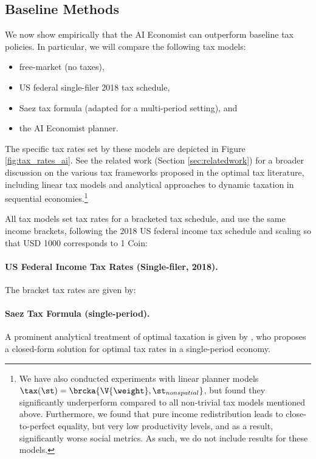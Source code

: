 \subsection{Baseline Methods}
\label{sect:baselines}
We now show empirically that the AI Economist can outperform baseline tax policies.
In particular, we will compare the following tax models:
\begin{itemize}
 \item free-market (no taxes),
 \item US federal single-filer 2018 tax schedule,
 \item Saez tax formula (adapted for a multi-period setting), and
 \item the AI Economist planner. %
\end{itemize}

The specific tax rates set by these models are depicted in Figure \ref{fig:tax_rates_ai}.
See the related work (Section \ref{sec:relatedwork}) for a broader discussion on the various tax frameworks proposed in the optimal tax literature, including linear tax models and analytical approaches to dynamic taxation in sequential economies.\footnote{We have also conducted experiments with linear planner models $\tax(\st) = \brcka{\V{\weight}, \st_{nonspatial}}$, but found they significantly underperform compared to all non-trivial tax models mentioned above.
Furthermore, we found that pure income redistribution leads to close-to-perfect equality, but very low productivity levels, and as a result, significantly worse social metrics.
As such, we do not include results for these models.}

All tax models set tax rates for a bracketed tax schedule, and use the same income brackets, following the 2018 US federal income tax schedule and scaling so that USD 1000 corresponds to 1 Coin:

\paragraph{US Federal Income Tax Rates (Single-filer, 2018).}
The bracket tax rates are given by:

\paragraph{Saez Tax Formula (single-period).}
A prominent analytical treatment of optimal taxation is given by
\cite{saez_using_2001}, who proposes a closed-form solution for optimal tax rates in a single-period economy.

